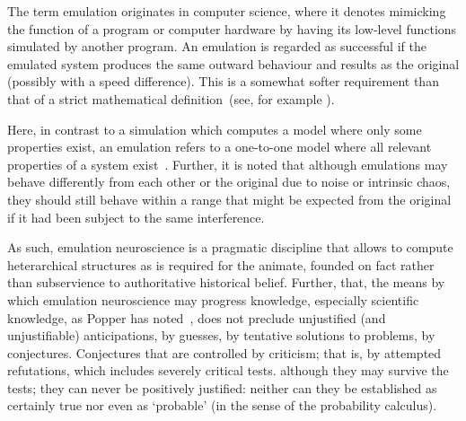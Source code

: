 \documentclass[10pt,letterpaper]{article}
\begin{document}

The term emulation originates in computer science, where it denotes mimicking the function of a program or computer hardware by having its low-level functions simulated by another program. An emulation is regarded as successful if the emulated system produces the same outward behaviour and results as the original (possibly with a speed difference). This is a somewhat softer requirement than that of a strict mathematical definition~(see, for example \cite{sandberg08}).


Here, in contrast to a simulation which computes a model where only some properties exist, an emulation refers to a one-to-one model where all relevant properties of a system exist~\cite{sandberg08}. Further, it is noted that although emulations may behave differently from each other or the original due to noise or intrinsic chaos, they should still behave within a range that might be expected from the original if it had been subject to the same interference.

As such, emulation neuroscience is a pragmatic discipline that allows to compute heterarchical structures as is required for the animate, founded on fact rather than subservience to authoritative historical belief.  Further, that, the means by which emulation neuroscience may progress knowledge, especially scientific knowledge, as Popper has noted~\cite{popper62}, does not preclude unjustified (and unjustifiable) anticipations, by guesses, by tentative solutions to problems, by conjectures. Conjectures that are controlled by criticism; that is, by attempted refutations, which includes severely critical tests. although they may survive the tests; they can never be positively justified: neither can they be established as certainly true nor even as `probable' (in the sense of the probability calculus).
\end{document}
